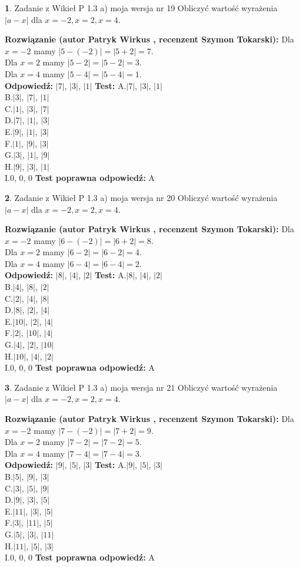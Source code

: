 \documentclass[12pt, a4paper]{article}
\theoremstyle{definition} %
\newtheorem{zad}{}
\newcommand{\zadStart}[1]{\begin{zad}#1\newline}
\newcommand{\zadStop}{\end{zad}}
\newcommand{\rozwStart}[2]{\noindent \textbf{Rozwiązanie (autor #1 , recenzent #2): }\newline}
\newcommand{\rozwStop}{\newline}
\newcommand{\odpStart}{\noindent \textbf{Odpowiedź:}\newline}
\newcommand{\odpStop}{\newline}
\newcommand{\testStart}{\noindent \textbf{Test:}\newline}
\newcommand{\testStop}{\newline}
\newcommand{\kluczStart}{\noindent \textbf{Test poprawna odpowiedź:}\newline}
\newcommand{\kluczStop}{\newline}
\begin{document}
\zadStart{Zadanie z Wikieł P 1.3 a) moja wersja nr 19}
Obliczyć wartość wyrażenia $|a - x|$ dla $x=-2,x=2,x=4$.
\zadStop
\rozwStart{Patryk Wirkus}{Szymon Tokarski}
Dla $x = -2$ mamy $|5 - (-2)| = |5 + 2| = 7$.\\
Dla $x = 2$ mamy $|5 - 2| = |5 - 2| = 3$.\\
Dla $x = 4$ mamy $|5 - 4| = |5 - 4| = 1$.\\
\rozwStop
\odpStart
$|7|$, $|3|$, $|1|$
\odpStop
\testStart
A.$|7|$, $|3|$, $|1|$\\
B.$|3|$, $|7|$, $|1|$\\
C.$|1|$, $|3|$, $|7|$\\
D.$|7|$, $|1|$, $|3|$\\
E.$|9|$, $|1|$, $|3|$\\
F.$|1|$, $|9|$, $|3|$\\
G.$|3|$, $|1|$, $|9|$\\
H.$|9|$, $|3|$, $|1|$\\
I.$0$, $0$, $0$
\testStop
\kluczStart
A
\kluczStop



\zadStart{Zadanie z Wikieł P 1.3 a) moja wersja nr 20}
Obliczyć wartość wyrażenia $|a - x|$ dla $x=-2,x=2,x=4$.
\zadStop
\rozwStart{Patryk Wirkus}{Szymon Tokarski}
Dla $x = -2$ mamy $|6 - (-2)| = |6 + 2| = 8$.\\
Dla $x = 2$ mamy $|6 - 2| = |6 - 2| = 4$.\\
Dla $x = 4$ mamy $|6 - 4| = |6 - 4| = 2$.\\
\rozwStop
\odpStart
$|8|$, $|4|$, $|2|$
\odpStop
\testStart
A.$|8|$, $|4|$, $|2|$\\
B.$|4|$, $|8|$, $|2|$\\
C.$|2|$, $|4|$, $|8|$\\
D.$|8|$, $|2|$, $|4|$\\
E.$|10|$, $|2|$, $|4|$\\
F.$|2|$, $|10|$, $|4|$\\
G.$|4|$, $|2|$, $|10|$\\
H.$|10|$, $|4|$, $|2|$\\
I.$0$, $0$, $0$
\testStop
\kluczStart
A
\kluczStop



\zadStart{Zadanie z Wikieł P 1.3 a) moja wersja nr 21}
Obliczyć wartość wyrażenia $|a - x|$ dla $x=-2,x=2,x=4$.
\zadStop
\rozwStart{Patryk Wirkus}{Szymon Tokarski}
Dla $x = -2$ mamy $|7 - (-2)| = |7 + 2| = 9$.\\
Dla $x = 2$ mamy $|7 - 2| = |7 - 2| = 5$.\\
Dla $x = 4$ mamy $|7 - 4| = |7 - 4| = 3$.\\
\rozwStop
\odpStart
$|9|$, $|5|$, $|3|$
\odpStop
\testStart
A.$|9|$, $|5|$, $|3|$\\
B.$|5|$, $|9|$, $|3|$\\
C.$|3|$, $|5|$, $|9|$\\
D.$|9|$, $|3|$, $|5|$\\
E.$|11|$, $|3|$, $|5|$\\
F.$|3|$, $|11|$, $|5|$\\
G.$|5|$, $|3|$, $|11|$\\
H.$|11|$, $|5|$, $|3|$\\
I.$0$, $0$, $0$
\testStop
\kluczStart
A
\kluczStop
\end{document}

